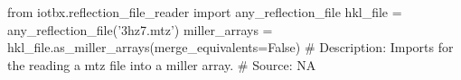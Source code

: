 from iotbx.reflection_file_reader import any_reflection_file
hkl_file = any_reflection_file('3hz7.mtz')
miller_arrays = hkl_file.as_miller_arrays(merge_equivalents=False)
# Description:  Imports for the reading a mtz file into a miller array.
# Source:  NA

